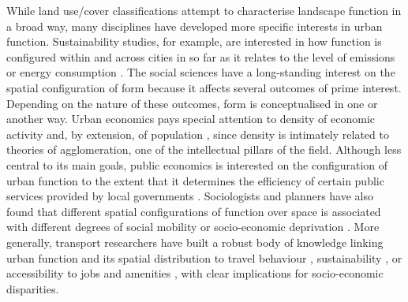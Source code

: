 While land use/cover classifications attempt to characterise landscape
function in a broad way, many disciplines have developed more specific
interests in urban function.
Sustainability studies, for example, are interested in how function is
configured within and across cities in so far as it relates to the level of
emissions \citep{angel2018shape} or energy consumption \citep{silva2017urban}.
The social sciences have a long-standing interest on the spatial
configuration of form because it affects several outcomes of prime interest.
Depending on the nature of these outcomes, form is conceptualised in one or
another way.
Urban economics pays special attention to density of economic activity and, by
extension, of population \citep{ahlfeldt2019, duranton2020economics}, since
density is intimately related to theories of agglomeration, one of the
intellectual pillars of the field.
Although less central to its main goals, public economics is interested on the
configuration of urban function to the extent that it determines the
efficiency of certain public services provided by local governments
\citep{carruthers2003urban, hortas2010does}.
Sociologists and planners have also found that different spatial configurations of function
over space is associated with different degrees of social mobility
\citep{ewing2016does} or socio-economic deprivation
\citep{venerandi2018scalable}.
More generally, transport researchers have built a robust body of knowledge
linking urban function and its spatial distribution to travel behaviour
\citep{boarnet2001travel}, sustainability \citep{sevtuk2020does}, or accessibility
to jobs \citep{horner2004exploring} and amenities \citep{diamond2013economics}, with clear implications for socio-economic disparities.


